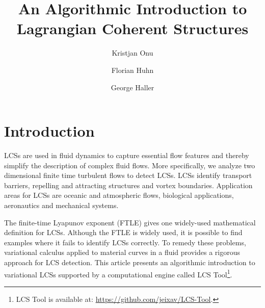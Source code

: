 \documentclass{article}
\title{An Algorithmic Introduction to Lagrangian Coherent Structures}
\author{Kristjan Onu \and Florian Huhn \and George Haller}
\begin{document}

\maketitle

\tableofcontents


\section{Introduction}

LCSs are used in fluid dynamics to capture essential flow features and thereby simplify the description of complex fluid flows. More specifically, we analyze two dimensional finite time turbulent flows to detect LCSs. LCSs identify transport barriers, repelling and attracting structures and vortex boundaries. Application areas for LCSs are oceanic and atmospheric flows, biological applications\parencite{wilson09:_lagran_reynol,tallapragada11:_lagran}, aeronautics\parencite{tang10:_accur_lagran_hong_kong_inter_airpor} and mechanical systems\parencite{hadjighasem13:_detec_kam}.

The finite-time Lyapunov exponent (FTLE) gives one widely-used mathematical definition for LCSs. Although the FTLE is widely used, it is possible to find examples where it fails to identify LCSs correctly\parencite{haller11:_lagran_coher_struc,norgard12:_secon_lagran_coher_struc}. To remedy these problems, variational calculus applied to material curves in a fluid provides a rigorous approach for LCS detection\parencite{haller11:_lagran_coher_struc,farazmand12:_comput_lagran,haller12:_geodes_theor_trans_barrier_two_dimen_flows,farazmand13:_attrac_lagran,haller13:_coher_lagran}. This article presents an algorithmic introduction to variational LCSs supported by a computational engine called LCS Tool\footnote{LCS Tool is available at: \url{https://github.com/jeixav/LCS-Tool}.}.
\end{document}
